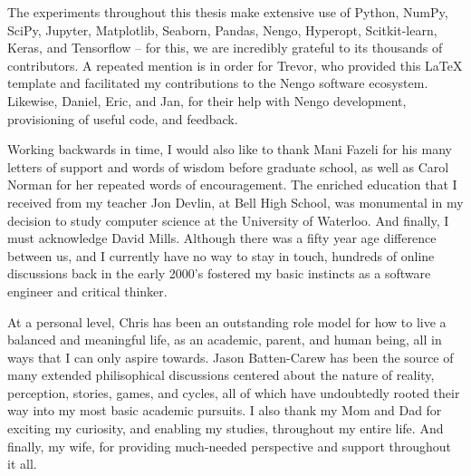 \newpage

The experiments throughout this thesis make extensive use of Python, NumPy, SciPy, Jupyter, Matplotlib, Seaborn, Pandas, Nengo, Hyperopt, Scitkit-learn, Keras, and Tensorflow -- for this, we are incredibly grateful to its thousands of contributors.
A repeated mention is in order for Trevor, who provided this \LaTeX{} template and facilitated my contributions to the Nengo software ecosystem.
Likewise, Daniel, Eric, and Jan, for their help with Nengo development, provisioning of useful code, and feedback.

Working backwards in time, I would also like to thank Mani Fazeli for his many letters of support and words of wisdom before graduate school, as well as Carol Norman for her repeated words of encouragement.
The enriched education that I received from my teacher Jon Devlin, at Bell High School, was monumental in my decision to study computer science at the University of Waterloo.
And finally, I must acknowledge David Mills. Although there was a fifty year age difference between us, and I currently have no way to stay in touch, hundreds of online discussions back in the early 2000's fostered my basic instincts as a software engineer and critical thinker.

At a personal level, Chris has been an outstanding role model for how to live a balanced and meaningful life, as an academic, parent, and human being, all in ways that I can only aspire towards.
Jason Batten-Carew has been the source of many extended philisophical discussions centered about the nature of reality, perception, stories, games, and cycles, all of which have undoubtedly rooted their way into my most basic academic pursuits.
I also thank my Mom and Dad for exciting my curiosity, and enabling my studies, throughout my entire life.
And finally, my wife, for providing much-needed perspective and support throughout it all.

\cleardoublepage
